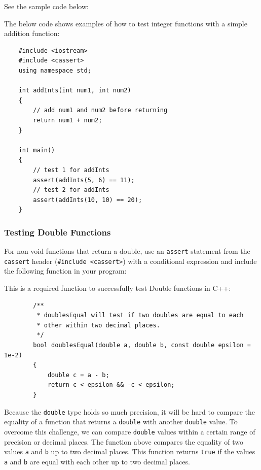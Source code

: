 See the sample code below:

\begin{example}
    The below code shows examples of how to test integer functions with a simple addition function:
    \begin{verbatim}
    #include <iostream>
    #include <cassert>
    using namespace std;
    
    int addInts(int num1, int num2)
    {
        // add num1 and num2 before returning
        return num1 + num2;
    }
    
    int main()
    {
        // test 1 for addInts
        assert(addInts(5, 6) == 11);
        // test 2 for addInts
        assert(addInts(10, 10) == 20);
    }
    \end{verbatim}
\end{example}

\subsubsection{Testing Double Functions}
For non-void functions that return a double, use an \texttt{assert} statement from the \texttt{cassert} header (\texttt{#include <cassert>}) with a conditional expression and include the following function in your program:

\begin{example}
    This is a required function to successfully test Double functions in C++:
    \begin{verbatim}
        /**
         * doublesEqual will test if two doubles are equal to each 
         * other within two decimal places.
         */
        bool doublesEqual(double a, double b, const double epsilon = 1e-2)
        {
            double c = a - b;
            return c < epsilon && -c < epsilon;
        }
    \end{verbatim}
\end{example}

Because the \texttt{double} type holds so much precision, it will be hard to compare the equality of a function that returns a \texttt{double} with another \texttt{double} value. To overcome this challenge, we can compare \texttt{double} values within a certain range of precision or decimal places. The function above compares the equality of two values \texttt{a} and \texttt{b} up to two decimal places. This function returns \texttt{true} if the values \texttt{a} and \texttt{b} are equal with each other up to two decimal places.

